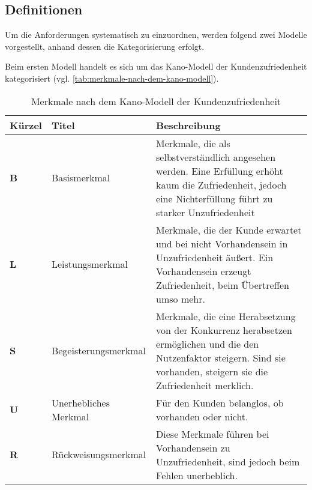 	
\subsection{Definitionen}
	
Um die Anforderungen systematisch zu einzuordnen, werden folgend zwei Modelle vorgestellt, anhand dessen die Kategorisierung erfolgt.

Beim ersten Modell handelt es sich um das Kano-Modell \cite{KanoModell} der Kundenzufriedenheit kategorisiert (vgl. \autoref{tab:merkmale-nach-dem-kano-modell}).
	
\begin{table}[H]
\begin{tabular}{ |p{1.15cm}|p{2.75cm}|p{9.6cm}| }
	\hline
	Kürzel & Titel & Beschreibung \\
	\hline
	\textbf{B} & Basis\-merkmal & Merkmale, die als selbstverständlich angesehen werden. Eine Erfüllung erhöht kaum die Zufriedenheit, jedoch eine Nichterfüllung führt zu starker Unzufriedenheit \\
	\hline
	\textbf{L} & Leistungs\-merkmal & Merkmale, die der Kunde erwartet und bei nicht Vorhandensein in Unzufriedenheit äußert. Ein Vorhandensein erzeugt Zufriedenheit, beim Übertreffen umso mehr. \\
	\hline
	\textbf{S} & Begeisterungs\-merkmal & Merkmale, die eine Herabsetzung von der Konkurrenz herabsetzen ermöglichen und die den Nutzenfaktor steigern. Sind sie vorhanden, steigern sie die Zufriedenheit merklich. \\
	\hline
	\textbf{U} & Unerhebliches Merkmal & Für den Kunden belanglos, ob vorhanden oder nicht. \\
	\hline
	\textbf{R} & Rückweisungs\-merkmal & Diese Merkmale führen bei Vorhandensein zu Unzufriedenheit, sind jedoch beim Fehlen unerheblich. \\
	\hline
\end{tabular}
 \captionsetup{justification=centering}
  \caption{Merkmale nach dem Kano-Modell der Kundenzufriedenheit}
   \label{tab:merkmale-nach-dem-kano-modell}
\end{table}

